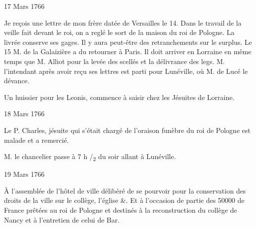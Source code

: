                      \begin{diary}{17 Mars 1766}{}

                         Je reçois une lettre de mon frère
                           datée
                           de Versailles
                           le 14. Dans le travail de la
                           veille fait devant le roi,
                           on a reglé le sort
                           de la maison du roi de Pologne. La livrée conserve ses
                           gages. Il y aura peut-être des retranchements
                           sur le surplus. Le 15
                           M. de la Galaizière a du
                           retourner à Paris. Il doit
                           arriver en
                           Lorraine en même temps que M. Alliot pour
                           la levée des scellés et la délivrance des legs.
                           M. l'intendant après avoir
                           reçu ses lettres
                           est parti pour Lunéville,
                           où M. de Lucé
                           le dévance. \bigskip


                         Un huissier pour les Leonis, commence
                           à saisir chez
                           les Jésuites de Lorraine. \bigskip


                     \end{diary}

                     \begin{diary}{18 Mars 1766}{}


                           Le P. Charles, jésuite qui s'était chargé de
                           l'oraison funèbre du roi de Pologne est malade et
                           a remercié. \bigskip



                           M. le chancelier passe à 7 h /\textsubscript{2} du soir
                           allant à Lunéville. \bigskip


                     \end{diary}

                     \begin{diary}{19 Mars 1766}{}

                         À l'assemblée de l'hôtel de ville délibéré
                           de se pourvoir pour la conservation des
                           droits de la ville sur le collège, l’église \&.
                           Et à l'occasion de partie des 50000 de
                              France
                           prêtées au roi de Pologne et destinés
                           à la reconstruction du collège de Nancy
                           et à l'entretien de celui de
                              Bar. \bigskip


                     \end{diary}


